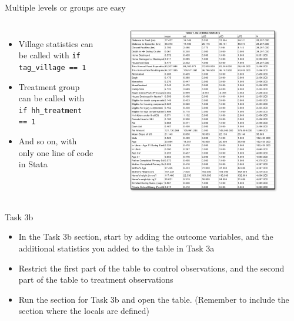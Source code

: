 \documentclass[aspectratio=169]{beamer}
\begin{document}
\begin{frame}[fragile]{Multiple levels or groups are easy}
	\begin{columns}[c]
		\begin{itemize}
			\item Village statistics can be called with \texttt{if tag\_village == 1}
			\item Treatment group can be called with \texttt{if hh\_treatment == 1}
			\item And so on, with only one line of code in Stata
		\end{itemize}
		\begin{figure}
			\centering
			\includegraphics[width=\linewidth]{img/table1}
		\end{figure}
	\end{columns}
\end{frame}


\begin{frame}{Task 3b}
	\begin{itemize}
		\item In the Task 3b section, start by adding the outcome variables, and the additional statistics you added to the table in Task 3a
		\item Restrict the first part of the table to control observations, and the second part of the table to treatment observations
		\item Run the section for Task 3b and open the table. (Remember to include the section where the locals are defined)
	\end{itemize}
\end{frame}
\end{document}
